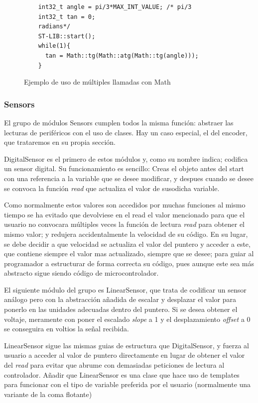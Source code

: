 \documentclass{report}
\begin{document}
\begin{figure}[H]
  \begin{lstlisting}
    int32_t angle = pi/3*MAX_INT_VALUE; /* pi/3 
    int32_t tan = 0;
    radians*/
    ST-LIB::start();
    while(1){
      tan = Math::tg(Math::atg(Math::tg(angle)));
    }
  \end{lstlisting}
  \caption{Ejemplo de uso de múltiples llamadas con Math}
  \label{MathNestedCode}
\end{figure}

\subsubsection{Sensors}
El grupo de módulos Sensors cumplen todos la misma función: abstraer las lecturas de periféricos con el uso de clases. Hay un caso especial, el del encoder, que trataremos en su propia sección. 
\par \vspace{0.3cm}
DigitalSensor es el primero de estos módulos y, como su nombre indica; codifica un sensor digital. Su funcionamiento es sencillo: Creas el objeto antes del start con una referencia a la variable que se desee modificar, y despues cuando se desee se convoca la función \textit{read} que actualiza el valor de susodicha variable. \par
Como normalmente estos valores son accedidos por muchas funciones al mismo tiempo se ha evitado que devolviese en el read el valor mencionado para que el usuario no convocara múltiples veces la función de lectura \textit{read} para obtener el mismo valor; y redujera accidentalmente la velocidad de su código. En su lugar, se debe decidir a que velocidad se actualiza el valor del puntero y acceder a este, que contiene siempre el valor mas actualizado, siempre que se desee; para guiar al programador a estructurar de forma correcta su código, pues aunque este sea más abstracto sigue siendo código de microcontrolador. 
\par \vspace{0.3cm}
El siguiente módulo del grupo es LinearSensor, que trata de codificar un sensor análogo pero con la abstracción añadida de escalar y desplazar el valor para ponerlo en las unidades adecuadas dentro del puntero. Si se desea obtener el voltaje, meramente con poner el escalado \textit{slope} a 1 y el desplazamiento \textit{offset} a 0 se conseguira en voltios la señal recibida. \par
LinearSensor sigue las mismas guias de estructura que DigitalSensor, y fuerza al usuario a acceder al valor de puntero directamente en lugar de obtener el valor del \textit{read} para evitar que abrume con demasiadas peticiones de lectura al controlador. Añadir que LinearSensor es una clase que hace uso de templates para funcionar con el tipo de variable preferida por el usuario (normalmente una variante de la coma flotante)
\end{document}
